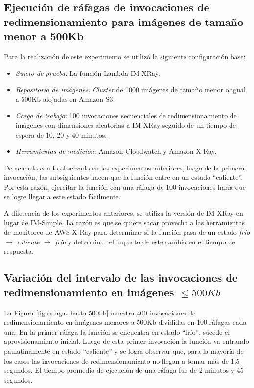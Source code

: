 \subsection{Ejecución de ráfagas de invocaciones de redimensionamiento para imágenes de tamaño menor a 500Kb}

Para la realización de este experimento se utilizó la siguiente configuración base:
\begin{itemize}
    \item \emph{Sujeto de prueba:} La función Lambda IM-XRay.
    \item \emph{Repositorio de imágenes:} \emph{Cluster} de 1000 imágenes de tamaño menor o igual a 500Kb alojadas en Amazon S3.
    \item \emph{Carga de trabajo:} 100 invocaciones secuenciales de redimensionamiento de imágenes con dimensiones aleatorias a IM-XRay seguido de un tiempo de espera de 10, 20 y 40 minutos.      
    \item \emph{Herramientas de medición:} Amazon Cloudwatch y Amazon X-Ray.
\end{itemize}
 
De acuerdo con lo observado en los experimentos anteriores, luego de la primera invocación, las subsiguientes hacen que la función entre en un estado ``caliente''. Por esta razón, ejercitar la función con una ráfaga de 100 invocaciones haría que se logre llegar a este estado fácilmente.

A diferencia de los experimentos anteriores, se utiliza la versión de IM-XRay en lugar de IM-Simple. La razón es que se quiere sacar provecho a las herramientas de monitoreo de AWS X-Ray para determinar si la función pasa de un estado \emph{frío $\rightarrow$ caliente $\rightarrow$ frío} y determinar el impacto de este cambio en el tiempo de respuesta.

\subsection{Variación del intervalo de las invocaciones de redimensionamiento en imágenes $\leq 500Kb$}\label{sec:rafagas-hasta-500kb}

La Figura \ref{fig:rafagas-hasta-500kb} muestra 400 invocaciones de redimensionamiento en imágenes menores a 500Kb divididas en 100 ráfagas cada una. En la primer ráfaga la función se encuentra en estado ``frío'', sucede el aprovisionamiento inicial. Luego de esta primer invocación la función va entrando paulatinamente en estado ``caliente'' y se logra observar que, para la mayoría de los casos las invocaciones de redimensionamiento no llegan a tomar más de 1,5 segundos. El tiempo promedio de ejecución de una ráfaga fue de 2 minutos y 45 segundos.

